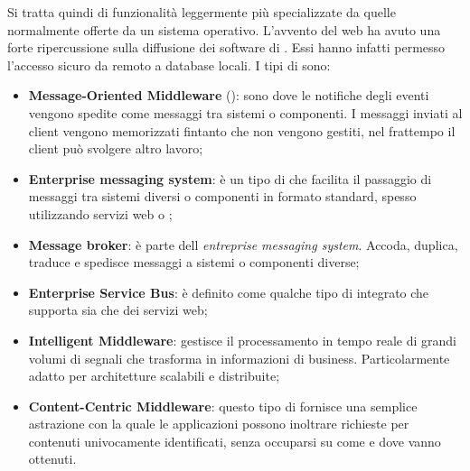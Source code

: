 Si tratta quindi di funzionalità leggermente più specializzate da quelle normalmente offerte da un sistema operativo. L'avvento del web ha avuto una forte ripercussione sulla diffusione dei software di . Essi hanno infatti permesso l'accesso sicuro da remoto a database locali. I tipi di  sono:
	
\begin{itemize}
	
	\item \textbf{Message-Oriented Middleware} (): sono  dove le notifiche degli eventi vengono spedite come messaggi tra sistemi o componenti. I messaggi inviati al client vengono memorizzati fintanto che non vengono gestiti, nel frattempo il client può svolgere altro lavoro;
	\item \textbf{Enterprise messaging system}: è un tipo di  che facilita il passaggio di messaggi tra sistemi diversi o componenti in formato standard, spesso utilizzando servizi web o ;
	\item \textbf{Message broker}: è parte dell \emph{entreprise messaging system}. Accoda, duplica, traduce e spedisce messaggi a sistemi o componenti diverse;
	\item \textbf{Enterprise Service Bus}: è definito come qualche tipo di  integrato che supporta sia  che dei servizi web;
	\item \textbf{Intelligent Middleware}: gestisce il processamento in tempo reale di grandi volumi di segnali che trasforma in informazioni di business. Particolarmente adatto per architetture scalabili e distribuite;
	\item \textbf{Content-Centric Middleware}: questo tipo di  fornisce una semplice astrazione con la quale le applicazioni possono inoltrare richieste per contenuti univocamente identificati, senza occuparsi su come e dove vanno ottenuti.
		
\end{itemize}	 
	
